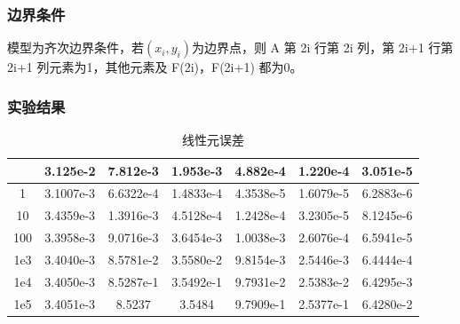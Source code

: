 \documentclass[a4paper,UTF8,titlepage]{ctexart}
\begin{document}
\subsubsection{边界条件}

模型为齐次边界条件，若$(x_i,y_i)$为边界点，则 A 第 2i 行第 2i 列，第 2i+1 行第 2i+1 列元素为1，其他元素及  F(2i)，F(2i+1) 都为0。


%
%

\subsubsection{实验结果}

\begin{table}[ht]
	\caption{线性元误差}
	\begin{tabular}{|c|c|c|c|c|c|c|} \hline
		\diagbox{$\lambda$}{h} &3.125e-2 &7.812e-3 &1.953e-3 &4.882e-4 &1.220e-4 &3.051e-5 \\ \hline
		1 &3.1007e-3 &6.6322e-4 &1.4833e-4 &4.3538e-5 &1.6079e-5 &6.2883e-6 \\ \hline
		10 &3.4359e-3 &1.3916e-3 &4.5128e-4 &1.2428e-4 &3.2305e-5 &8.1245e-6 \\ \hline
		100 &3.3958e-3 &9.0716e-3 &3.6454e-3 &1.0038e-3 &2.6076e-4 &6.5941e-5 \\ \hline
		1e3 &3.4040e-3 &8.5781e-2 &3.5580e-2 &9.8154e-3 &2.5446e-3 &6.4444e-4 \\ \hline
		1e4 &3.4050e-3 &8.5287e-1 &3.5492e-1 &9.7931e-2 &2.5383e-2 &6.4295e-3 \\ \hline
		1e5 &3.4051e-3 &8.5237 &3.5484 &9.7909e-1 &2.5377e-1 &6.4280e-2 \\ \hline
	\end{tabular}
\end{table}
\end{document}
